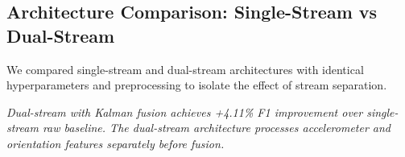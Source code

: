 \subsection{Architecture Comparison: Single-Stream vs Dual-Stream}
\label{sec:arch_stream_comparison}

We compared single-stream and dual-stream architectures with identical hyperparameters and preprocessing to isolate the effect of stream separation.

\begin{table}[htbp]
\centering
\caption{Single-Stream vs Dual-Stream Architecture Comparison (21-fold LOSO-CV)}
\label{tab:stream_comparison}
\vspace{1mm}
\scriptsize
\textit{Dual-stream with Kalman fusion achieves +4.11\% F1 improvement over single-stream raw baseline. The dual-stream architecture processes accelerometer and orientation features separately before fusion.}
\end{table}

